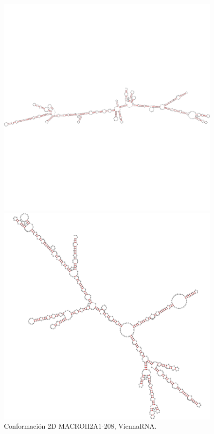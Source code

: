 \documentclass[a4paper,11pt,titlepage]{article}
\theoremstyle{definition}
\begin{document}
\begin{figure}[H]
    \centering
    \begin{minipage}[c]{0.23\textwidth}
        \centering
        \includegraphics[width=\textwidth]{images/MACROH2A1-208-db_vrna.png}
        \caption{Conformación 2D MACROH2A1-208, ViennaRNA.}
        \label{fig:MACROH2A1-208-vrna}
    \end{minipage}
    \hfill
    \begin{minipage}[c]{0.23\textwidth}
        \centering
        \includegraphics[width=\textwidth]{images/MACROH2A1-208-db_sqf.png}

\end{minipage}
\end{figure}
\end{document}
